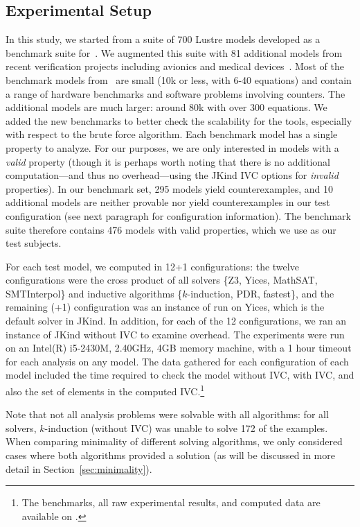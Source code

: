 \subsection{Experimental Setup}
In this study, we started from a suite of 700 Lustre models developed
as a benchmark suite for~\cite{Hagen08:FMCAD}. We augmented this suite
with 81 additional models from recent verification projects including
avionics and medical devices~\cite{QFCS15:backes,hilt2013}. Most of
the benchmark models from~\cite{Hagen08:FMCAD} are small (10k or less,
with 6-40 equations) and contain a range of hardware benchmarks and
software problems involving counters. The additional models are much
larger: around 80k with over 300 equations. We added the new
benchmarks to better check the scalability for the tools, especially
with respect to the brute force algorithm.
%
Each benchmark model has a single property to analyze.  For our purposes, we are only interested in models with a {\em valid} property (though it is perhaps worth noting that there is no additional computation---and thus no overhead---using the JKind IVC options for {\em invalid} properties).  In our benchmark set, 295 models yield counterexamples, and 10 additional models are neither provable nor yield counterexamples in our test configuration (see next paragraph for configuration information).  The benchmark suite therefore contains 476 models with valid properties, which we use as our test subjects.

For each test model, we computed \ucalg in 12+1 configurations: the
twelve configurations were the cross product of all solvers \{Z3,
Yices, MathSAT, SMTInterpol\} and inductive algorithms
\{$k$-induction, PDR, fastest\}, and the remaining (+1) configuration
was an instance of \bfalg run on Yices, which is the default solver in
JKind. In addition, for each of the 12 configurations, we ran an
instance of JKind without IVC to examine overhead. The experiments
were run on an Intel(R) i5-2430M, 2.40GHz, 4GB memory machine, with a
1 hour timeout for each analysis on any model. The data gathered for
each configuration of each model included the time required to check
the model without IVC, with IVC, and also the set of elements in the
computed IVC.\footnote{The benchmarks, all raw experimental results,
  and computed data are available on \cite{expr}.}

Note that not all analysis problems were solvable with all algorithms: for all solvers, $k$-induction (without IVC) was unable to solve 172 of the examples.  When comparing minimality of different solving algorithms, we only considered cases where both algorithms provided a solution (as will be discussed in more detail in Section~\ref{sec:minimality}).

